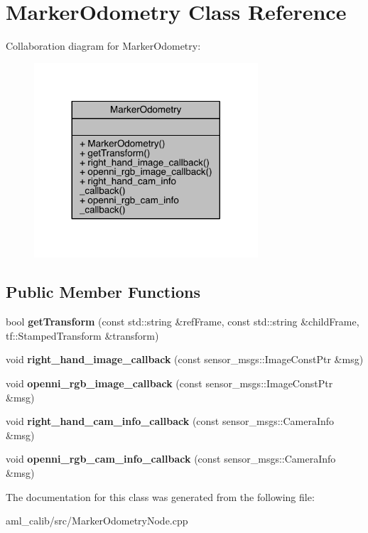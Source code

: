 \hypertarget{class_marker_odometry}{}\section{Marker\+Odometry Class Reference}
\label{class_marker_odometry}


Collaboration diagram for Marker\+Odometry\+:\nopagebreak
\begin{figure}[H]
\begin{center}
\leavevmode
\includegraphics[width=236pt]{class_marker_odometry__coll__graph}
\end{center}
\end{figure}
\subsection*{Public Member Functions}
\begin{DoxyCompactItemize}
\item 
\hypertarget{class_marker_odometry_a991ccdf619ec3c08249f0e8c7b1dfb16}{}\label{class_marker_odometry_a991ccdf619ec3c08249f0e8c7b1dfb16} 
bool {\bfseries get\+Transform} (const std\+::string \&ref\+Frame, const std\+::string \&child\+Frame, tf\+::\+Stamped\+Transform \&transform)
\item 
\hypertarget{class_marker_odometry_a0830cb1778e608a0f3740ed7075d45b2}{}\label{class_marker_odometry_a0830cb1778e608a0f3740ed7075d45b2} 
void {\bfseries right\+\_\+hand\+\_\+image\+\_\+callback} (const sensor\+\_\+msgs\+::\+Image\+Const\+Ptr \&msg)
\item 
\hypertarget{class_marker_odometry_af6619fc8e9f0183bac7dc40c3a07d097}{}\label{class_marker_odometry_af6619fc8e9f0183bac7dc40c3a07d097} 
void {\bfseries openni\+\_\+rgb\+\_\+image\+\_\+callback} (const sensor\+\_\+msgs\+::\+Image\+Const\+Ptr \&msg)
\item 
\hypertarget{class_marker_odometry_adce78bf3c045cd8b6d543a10e926aeb4}{}\label{class_marker_odometry_adce78bf3c045cd8b6d543a10e926aeb4} 
void {\bfseries right\+\_\+hand\+\_\+cam\+\_\+info\+\_\+callback} (const sensor\+\_\+msgs\+::\+Camera\+Info \&msg)
\item 
\hypertarget{class_marker_odometry_a90f3cc35183a070f578f7f1f57b6c0d8}{}\label{class_marker_odometry_a90f3cc35183a070f578f7f1f57b6c0d8} 
void {\bfseries openni\+\_\+rgb\+\_\+cam\+\_\+info\+\_\+callback} (const sensor\+\_\+msgs\+::\+Camera\+Info \&msg)
\end{DoxyCompactItemize}


The documentation for this class was generated from the following file\+:\begin{DoxyCompactItemize}
\item 
aml\+\_\+calib/src/Marker\+Odometry\+Node.\+cpp\end{DoxyCompactItemize}

